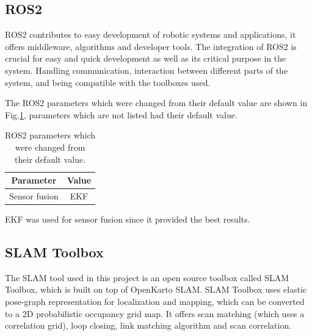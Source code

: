 



\subsection{ROS2}

ROS2 contributes to easy development of robotic systems and applications, it offers middleware, algorithms and developer tools\:\cite{macenski_robot_2022}. 
The integration of ROS2 is crucial for easy and quick development as well as its critical purpose in the system. Handling communication, interaction between different parts of the system, and being compatible with the toolboxes used\:\cite{macenski_impact_2023}\cite{macenski_robot_2022}.



The ROS2 parameters which were changed from their default value are shown in Fig.\:\ref{tab:ros2_params_changed}, parameters which are not listed had their default value.
\begin{table}
    \centering
    \begin{tabular}{|c|c|} \hline
         \textbf{Parameter}         & \textbf{Value}    \\ \hline
         Sensor fusion              & EKF               \\ \hline
    \end{tabular}
    \caption{ROS2 parameters which were changed from their default value.}
    \label{tab:ros2_params_changed}
\end{table}
EKF was used for sensor fusion since it provided the best results.


\subsection{SLAM Toolbox}

The SLAM tool used in this project is an open source toolbox called SLAM Toolbox, which is built on top of OpenKarto SLAM\:\cite{macenski_slam_2021}\cite{macenski_desks_2023}\cite{macenski_use_2019}.
SLAM Toolbox uses elastic pose-graph representation for localization and mapping\:\cite{macenski_use_2019}, which can be converted to a 2D probabilistic occupancy grid map\:\cite{macenski_slam_2021}. 
It offers scan matching (which uses a correlation grid), loop closing, link matching algorithm and scan correlation\:\cite{macenski_slam_2021}.

